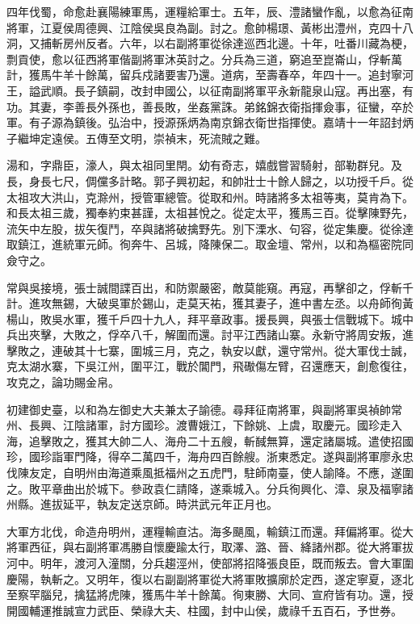 \begin{pinyinscope}
四年伐蜀，命愈赴襄陽練軍馬，運糧給軍士。五年，辰、澧諸蠻作亂，以愈為征南將軍，江夏侯周德興、江陰侯吳良為副。討之。愈帥楊璟、黃彬出澧州，克四十八洞，又捕斬房州反者。六年，以右副將軍從徐達巡西北邊。十年，吐番川藏為梗，剽貢使，愈以征西將軍偕副將軍沐英討之。分兵為三道，窮追至崑崙山，俘斬萬計，獲馬牛羊十餘萬，留兵戍諸要害乃還。道病，至壽春卒，年四十一。追封寧河王，謚武順。長子鎮嗣，改封申國公，以征南副將軍平永新龍泉山寇。再出塞，有功。其妻，李善長外孫也，善長敗，坐姦黨誅。弟銘錦衣衛指揮僉事，征蠻，卒於軍。有子源為鎮後。弘治中，授源孫炳為南京錦衣衛世指揮使。嘉靖十一年詔封炳子繼坤定遠侯。五傳至文明，崇禎末，死流賊之難。

湯和，字鼎臣，濠人，與太祖同里閈。幼有奇志，嬉戲嘗習騎射，部勒群兒。及長，身長七尺，倜儻多計略。郭子興初起，和帥壯士十餘人歸之，以功授千戶。從太祖攻大洪山，克滁州，授管軍總管。從取和州。時諸將多太祖等夷，莫肯為下。和長太祖三歲，獨奉約束甚謹，太祖甚悅之。從定太平，獲馬三百。從擊陳野先，流矢中左股，拔矢復鬥，卒與諸將破擒野先。別下溧水、句容，從定集慶。從徐達取鎮江，進統軍元師。徇奔牛、呂城，降陳保二。取金壇、常州，以和為樞密院同僉守之。

常與吳接境，張士誠間諜百出，和防禦嚴密，敵莫能窺。再寇，再擊卻之，俘斬千計。進攻無錫，大破吳軍於錫山，走莫天祐，獲其妻子，進中書左丞。以舟師徇黃楊山，敗吳水軍，獲千戶四十九人，拜平章政事。援長興，與張士信戰城下。城中兵出夾擊，大敗之，俘卒八千，解圍而還。討平江西諸山寨。永新守將周安叛，進擊敗之，連破其十七寨，圍城三月，克之，執安以獻，還守常州。從大軍伐士誠，克太湖水寨，下吳江州，圍平江，戰於閶門，飛礮傷左臂，召還應天，創愈復往，攻克之，論功賜金帛。

初建御史臺，以和為左御史大夫兼太子諭德。尋拜征南將軍，與副將軍吳禎帥常州、長興、江陰諸軍，討方國珍。渡曹娥江，下餘姚、上虞，取慶元。國珍走入海，追擊敗之，獲其大帥二人、海舟二十五艘，斬馘無算，還定諸屬城。遣使招國珍，國珍詣軍門降，得卒二萬四千，海舟四百餘艘。浙東悉定。遂與副將軍廖永忠伐陳友定，自明州由海道乘風抵福州之五虎門，駐師南臺，使人諭降。不應，遂圍之。敗平章曲出於城下。參政袁仁請降，遂乘城入。分兵徇興化、漳、泉及福寧諸州縣。進拔延平，執友定送京師。時洪武元年正月也。

大軍方北伐，命造舟明州，運糧輸直沽。海多颶風，輸鎮江而還。拜偏將軍。從大將軍西征，與右副將軍馮勝自懷慶踰太行，取澤、潞、晉、絳諸州郡。從大將軍拔河中。明年，渡河入潼關，分兵趨涇州，使部將招降張良臣，既而叛去。會大軍圍慶陽，執斬之。又明年，復以右副副將軍從大將軍敗擴廓於定西，遂定寧夏，逐北至察罕腦兒，擒猛將虎陳，獲馬牛羊十餘萬。徇東勝、大同、宣府皆有功。還，授開國輔運推誠宣力武臣、榮祿大夫、柱國，封中山侯，歲祿千五百石，予世券。


\end{pinyinscope}
